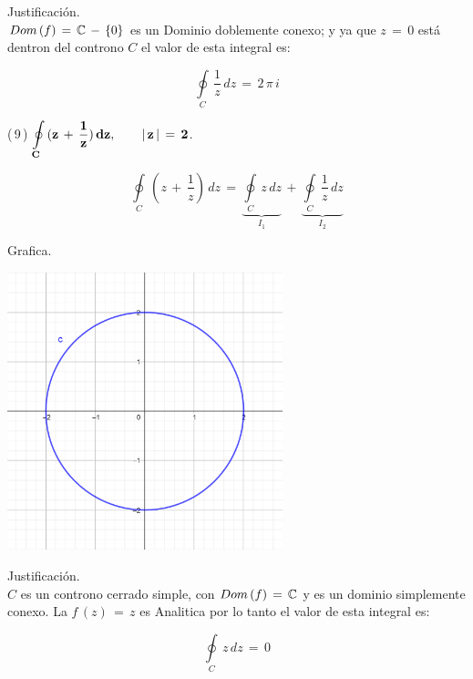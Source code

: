 \documentclass[a4paper,11pt,openany]{book}
\begin{document}
\textcolor{ao(english)}{} Justificación.\\

$\mathnormal{Dom\,(f)}\,=\,\mathbb C\,-\,\{0\}$ es un Dominio doblemente conexo; y ya que $z\,=\,0$ está dentron del controno $C$ el valor de esta integral es:

$$\displaystyle\oint\limits_{C}\,\dfrac{1}{z}\,dz\,=\,2\,\pi\,i$$

\textcolor{ao(english)}{(\,9\,)} $\bf{\displaystyle\oint\limits_{C}\,(z\,+\,\dfrac{1}{z})\,dz}, \qquad |\,z\,|\,=\,2$.

$$\displaystyle\oint\limits_{C}\,(z\,+\,\dfrac{1}{z})\,dz\,=\,\underbrace{\displaystyle\oint\limits_{C}\,z\,dz}_{I_{1}}\,+\,\underbrace{\displaystyle\oint\limits_{C}\,\dfrac{1}{z}\,dz}_{I_{2}}$$

\begin{tcolorbox}[colback=ao(english)!5!white,colframe=ao(english)!75!black,fonttitle=\bfseries,title=\sf $I_{1}$]

\textcolor{ao(english)}{} Grafica.

\begin{center}
     \includegraphics[width=8cm]{Gra-Ej-9-1.png}
\end{center}

\textcolor{ao(english)}{} Justificación.\\

$C$ es un controno cerrado simple, con $\mathnormal{Dom\,(f)}\,=\,\mathbb C$ y  es un dominio simplemente conexo. La $f\,(z)\,=\,z$ es Analitica por lo tanto el valor de esta integral es:

$$\displaystyle\oint\limits_{C}\,z\,dz\,=\,0$$

\end{tcolorbox}
\end{document}
